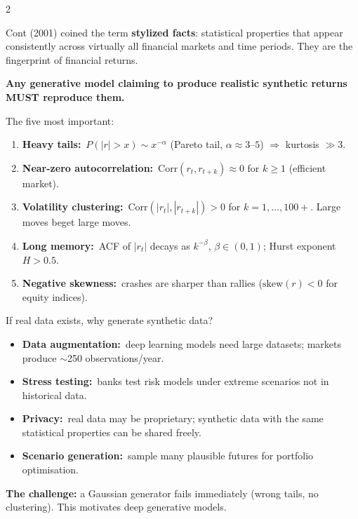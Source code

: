 \documentclass[10pt]{article}
\newcommand{\tealbox}[2]{\begin{tcolorbox}[mybox={Teal}{LBg},title={#1}]#2\end{tcolorbox}}
\newcommand{\purplebox}[2]{\begin{tcolorbox}[mybox={Purple}{LBg},title={#1}]#2\end{tcolorbox}}
\begin{document}
\begin{multicols}{2}
\columnbreak

\tealbox{What Are Stylized Facts?}{%
Cont (2001) coined the term \textbf{stylized facts}: statistical properties that appear consistently across virtually all financial markets and time periods. They are the fingerprint of financial returns.

\textbf{Any generative model claiming to produce realistic synthetic returns MUST reproduce them.}

The five most important:
\begin{enumerate}
  \item \textbf{Heavy tails:}\ $P(|r|>x) \sim x^{-\alpha}$ (Pareto tail, $\alpha \approx 3$--$5$) $\Rightarrow$ kurtosis $\gg 3$.
  \item \textbf{Near-zero autocorrelation:}\ $\text{Corr}(r_t, r_{t+k}) \approx 0$ for $k \geq 1$ (efficient market).
  \item \textbf{Volatility clustering:}\ $\text{Corr}(|r_t|, |r_{t+k}|) > 0$ for $k = 1,\ldots,100+$. Large moves beget large moves.
  \item \textbf{Long memory:}\ ACF of $|r_t|$ decays as $k^{-\beta}$, $\beta \in (0,1)$; Hurst exponent $H > 0.5$.
  \item \textbf{Negative skewness:}\ crashes are sharper than rallies ($\text{skew}(r) < 0$ for equity indices).
\end{enumerate}}

\purplebox{Why Generate Synthetic Data?}{%
If real data exists, why generate synthetic data?
\begin{itemize}
  \item \textbf{Data augmentation:}\ deep learning models need large datasets; markets produce $\sim$250 observations/year.
  \item \textbf{Stress testing:}\ banks test risk models under extreme scenarios not in historical data.
  \item \textbf{Privacy:}\ real data may be proprietary; synthetic data with the same statistical properties can be shared freely.
  \item \textbf{Scenario generation:}\ sample many plausible futures for portfolio optimisation.
\end{itemize}
\textbf{The challenge:} a Gaussian generator fails immediately (wrong tails, no clustering). This motivates deep generative models.}

\end{multicols}

\clearpage
\end{document}
